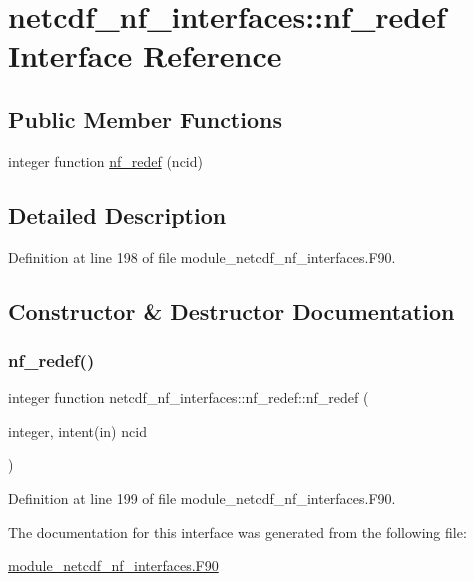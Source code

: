 \hypertarget{interfacenetcdf__nf__interfaces_1_1nf__redef}{}\section{netcdf\+\_\+nf\+\_\+interfaces\+:\+:nf\+\_\+redef Interface Reference}
\label{interfacenetcdf__nf__interfaces_1_1nf__redef}
\subsection*{Public Member Functions}
\begin{DoxyCompactItemize}
\item 
integer function \hyperlink{interfacenetcdf__nf__interfaces_1_1nf__redef_a4c6c1ed2ffc8757bcacaa17d554c1fed}{nf\+\_\+redef} (ncid)
\end{DoxyCompactItemize}


\subsection{Detailed Description}


Definition at line 198 of file module\+\_\+netcdf\+\_\+nf\+\_\+interfaces.\+F90.



\subsection{Constructor \& Destructor Documentation}
\mbox{\label{interfacenetcdf__nf__interfaces_1_1nf__redef_a4c6c1ed2ffc8757bcacaa17d554c1fed}} 
\subsubsection{\texorpdfstring{nf\+\_\+redef()}{nf\_redef()}}
{\footnotesize\ttfamily integer function netcdf\+\_\+nf\+\_\+interfaces\+::nf\+\_\+redef\+::nf\+\_\+redef (\begin{DoxyParamCaption}\item[{integer, intent(in)}]{ncid }\end{DoxyParamCaption})}



Definition at line 199 of file module\+\_\+netcdf\+\_\+nf\+\_\+interfaces.\+F90.



The documentation for this interface was generated from the following file\+:\begin{DoxyCompactItemize}
\item 
\hyperlink{module__netcdf__nf__interfaces_8F90}{module\+\_\+netcdf\+\_\+nf\+\_\+interfaces.\+F90}\end{DoxyCompactItemize}
